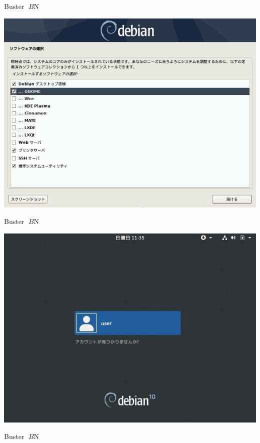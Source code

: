 \documentclass[mingoth,a4paper]{jsarticle}
\begin{document}
{{Buster $B$N%

\begin{center}
\includegraphics[keepaspectratio,width=1\hsize]{image201907/buster_tasksel_1.png}
\end{center}



Buster $B$N%

\begin{center}
\includegraphics[keepaspectratio,width=1\hsize]{image201907/buster_gdm3.png}
\end{center}



Buster $B$N%

}}
\end{document}
